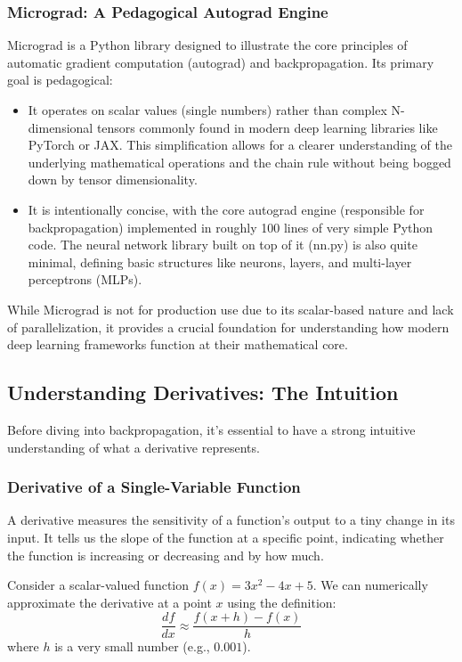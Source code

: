 \subsubsection{Micrograd: A Pedagogical Autograd Engine} 
Micrograd is a Python library designed to illustrate the core principles of automatic gradient computation (autograd) and backpropagation. Its primary goal is pedagogical: 
\begin{itemize} 
\item It operates on scalar values (single numbers) rather than complex N-dimensional tensors commonly found in modern deep learning libraries like PyTorch or JAX. This simplification allows for a clearer understanding of the underlying mathematical operations and the chain rule without being bogged down by tensor dimensionality. 
\item It is intentionally concise, with the core autograd engine (responsible for backpropagation) implemented in roughly 100 lines of very simple Python code. The neural network library built on top of it (nn.py) is also quite minimal, defining basic structures like neurons, layers, and multi-layer perceptrons (MLPs). 
\end{itemize} 
While Micrograd is not for production use due to its scalar-based nature and lack of parallelization, it provides a crucial foundation for understanding how modern deep learning frameworks function at their mathematical core.

\subsection{Understanding Derivatives: The Intuition}
Before diving into backpropagation, it's essential to have a strong intuitive understanding of what a derivative represents.

\subsubsection{Derivative of a Single-Variable Function} 
A derivative measures the sensitivity of a function's output to a tiny change in its input. It tells us the slope of the function at a specific point, indicating whether the function is increasing or decreasing and by how much.

Consider a scalar-valued function $f(x) = 3x^2 - 4x + 5$. We can numerically approximate the derivative at a point $x$ using the definition: 
$$ \frac{df}{dx} \approx \frac{f(x+h) - f(x)}{h} $$ 
where $h$ is a very small number (e.g., $0.001$).

